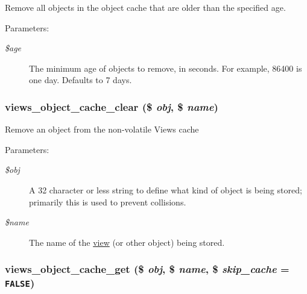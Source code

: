Remove all objects in the object cache that are older than the specified age.

\begin{Desc}
\item[Parameters:]
\begin{description}
\item[{\em \$age}]The minimum age of objects to remove, in seconds. For example, 86400 is one day. Defaults to 7 days. \end{description}
\end{Desc}
\hypertarget{group__views__object__cache_g459b053443336216db7aa476065893e5}{
\subsubsection[{views\_\-object\_\-cache\_\-clear}]{\setlength{\rightskip}{0pt plus 5cm}views\_\-object\_\-cache\_\-clear (\$ {\em obj}, \/  \$ {\em name})}}
\label{group__views__object__cache_g459b053443336216db7aa476065893e5}


Remove an object from the non-volatile Views cache

\begin{Desc}
\item[Parameters:]
\begin{description}
\item[{\em \$obj}]A 32 character or less string to define what kind of object is being stored; primarily this is used to prevent collisions. \item[{\em \$name}]The name of the \hyperlink{classview}{view} (or other object) being stored. \end{description}
\end{Desc}
\hypertarget{group__views__object__cache_gd5f513bc1c239a13aa96905361ef3e96}{
\subsubsection[{views\_\-object\_\-cache\_\-get}]{\setlength{\rightskip}{0pt plus 5cm}views\_\-object\_\-cache\_\-get (\$ {\em obj}, \/  \$ {\em name}, \/  \$ {\em skip\_\-cache} = {\tt FALSE})}}
\label{group__views__object__cache_gd5f513bc1c239a13aa96905361ef3e96}


